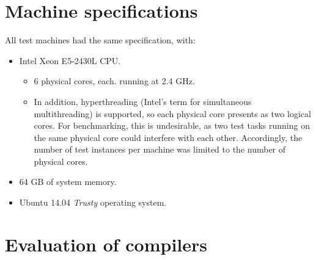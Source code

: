 \section{Machine specifications} \label{appendix:test-machine-spec}

All test machines had the same specification, with:
\begin{itemize}
    \item Intel Xeon E5-2430L CPU.
    \begin{itemize}
        \item 6 physical cores, each. running at 2.4 GHz.
        \item In addition, hyperthreading (Intel's term for simultaneous multithreading) is supported, so each physical core presents as two logical cores. For benchmarking, this is undesirable, as two test tasks running on the same physical core could interfere with each other. Accordingly, the number of test instances per machine was limited to the number of physical cores.
    \end{itemize}
    \item 64 GB of system memory.
    \item Ubuntu 14.04 \textit{Trusty} operating system.
\end{itemize}

\section{Evaluation of compilers} \label{appendix:test-compilers}

